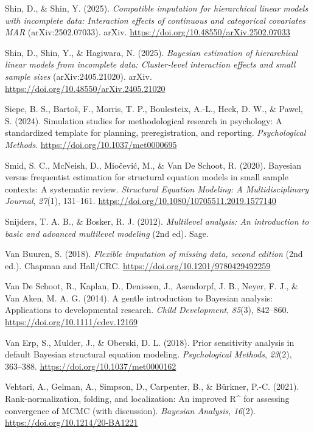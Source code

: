 \documentclass[
  letterpaper,
  11pt,
  english,
  singlespacing,
  headsepline,
  openany]{MastersDoctoralThesis}
\newlength{\cslhangindent}
\newenvironment{CSLReferences}[2] %
 {\begin{list}{}{%
  \setlength{\itemindent}{0pt}
  \setlength{\leftmargin}{0pt}
  \setlength{\parsep}{0pt}
  \ifodd #1
   \setlength{\leftmargin}{\cslhangindent}
   \setlength{\itemindent}{-1\cslhangindent}
  \fi
  \setlength{\itemsep}{#2\baselineskip}}}
 {\end{list}}
\begin{document}
\begin{CSLReferences}{1}{0}
Shin, D., \& Shin, Y. (2025). \emph{Compatible imputation for
hierarchical linear models with incomplete data: {Interaction} effects
of continuous and categorical covariates {MAR}} (arXiv:2502.07033).
arXiv. \url{https://doi.org/10.48550/arXiv.2502.07033}

Shin, D., Shin, Y., \& Hagiwara, N. (2025). \emph{Bayesian estimation of
hierarchical linear models from incomplete data: {Cluster-level}
interaction effects and small sample sizes} (arXiv:2405.21020). arXiv.
\url{https://doi.org/10.48550/arXiv.2405.21020}

Siepe, B. S., Bartoš, F., Morris, T. P., Boulesteix, A.-L., Heck, D. W.,
\& Pawel, S. (2024). Simulation studies for methodological research in
psychology: {A} standardized template for planning, preregistration, and
reporting. \emph{Psychological Methods}.
\url{https://doi.org/10.1037/met0000695}

Smid, S. C., McNeish, D., Miočević, M., \& Van De Schoot, R. (2020).
Bayesian versus frequentist estimation for structural equation models in
small sample contexts: A systematic review. \emph{Structural Equation
Modeling: A Multidisciplinary Journal}, \emph{27}(1), 131--161.
\url{https://doi.org/10.1080/10705511.2019.1577140}

Snijders, T. A. B., \& Bosker, R. J. (2012). \emph{Multilevel analysis:
An introduction to basic and advanced multilevel modeling} (2nd ed).
Sage.

Van Buuren, S. (2018). \emph{Flexible imputation of missing data, second
edition} (2nd ed.). {Chapman and Hall/CRC}.
\url{https://doi.org/10.1201/9780429492259}

Van De Schoot, R., Kaplan, D., Denissen, J., Asendorpf, J. B., Neyer, F.
J., \& Van Aken, M. A. G. (2014). A gentle introduction to {Bayesian}
analysis: {Applications} to developmental research. \emph{Child
Development}, \emph{85}(3), 842--860.
\url{https://doi.org/10.1111/cdev.12169}

Van Erp, S., Mulder, J., \& Oberski, D. L. (2018). Prior sensitivity
analysis in default {Bayesian} structural equation modeling.
\emph{Psychological Methods}, \emph{23}(2), 363--388.
\url{https://doi.org/10.1037/met0000162}

Vehtari, A., Gelman, A., Simpson, D., Carpenter, B., \& Bürkner, P.-C.
(2021). Rank-normalization, folding, and localization: {An} improved
{R\^{}} for assessing convergence of {MCMC} (with discussion).
\emph{Bayesian Analysis}, \emph{16}(2).
\url{https://doi.org/10.1214/20-BA1221}


\end{CSLReferences}
\end{document}
